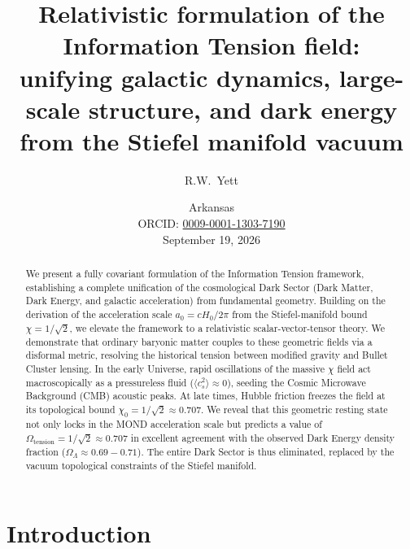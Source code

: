 \documentclass[twocolumn,amsmath,amssymb,floatfix]{article}
\begin{document}
\title{Relativistic formulation of the Information Tension field:\\
unifying galactic dynamics, large-scale structure, and dark energy\\
from the Stiefel manifold vacuum}

\author{R.W.\ Yett}
\date{%
  \small Arkansas\\[2pt]
  \small ORCID: \href{https://orcid.org/0009-0001-1303-7190}{0009-0001-1303-7190}\\[6pt]
  \small September 19, 2026
}

\maketitle


\begin{abstract}
We present a fully covariant formulation of the Information Tension framework, establishing a complete unification of the cosmological Dark Sector (Dark Matter, Dark Energy, and galactic acceleration) from fundamental geometry. Building on the derivation of the acceleration scale $a_0 = c H_0 / 2\pi$ from the Stiefel-manifold bound $\chi = 1/\sqrt{2}$, we elevate the framework to a relativistic scalar-vector-tensor theory. We demonstrate that ordinary baryonic matter couples to these geometric fields via a disformal metric, resolving the historical tension between modified gravity and Bullet Cluster lensing. In the early Universe, rapid oscillations of the massive $\chi$ field act macroscopically as a pressureless fluid ($\langle c_s^2 \rangle \approx 0$), seeding the Cosmic Microwave Background (CMB) acoustic peaks. At late times, Hubble friction freezes the field at its topological bound $\chi_0 = 1/\sqrt{2} \approx 0.707$. We reveal that this geometric resting state not only locks in the MOND acceleration scale but predicts a value of $\Omega_{\text{tension}} = 1/\sqrt{2} \approx 0.707$ in excellent agreement with the observed Dark Energy density fraction ($\Omega_\Lambda \approx 0.69 - 0.71$). The entire Dark Sector is thus eliminated, replaced by the vacuum topological constraints of the Stiefel manifold.
\end{abstract}

\section{Introduction}
\end{document}
